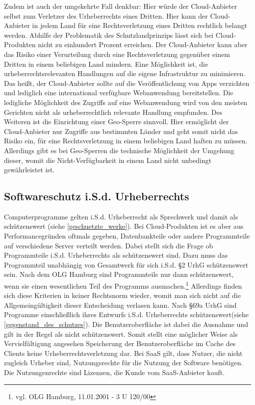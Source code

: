 Zudem ist auch der umgekehrte Fall denkbar: Hier w\"urde der Cloud-Anbieter selbst zum Verletzer des Urheberrechts eines Dritten. Hier kann der Cloud-Anbieter in jedem Land f\"ur eine Rechtsverletzung eines Dritten rechtlich belangt werden. Abhilfe der Problematik des Schutzlandprinzips l\"asst sich bei Cloud-Produkten nicht zu einhundert Prozent erreichen. Der Cloud-Anbieter kann aber das Risiko einer Verurteilung durch eine Rechtsverletzung gegen\"uber einem Dritten in einem beliebigen Land mindern. Eine M\"oglichkeit ist, die urheberrechtsrelevanten Handlungen auf die eigene Infrastruktur zu minimieren. Das hei{\ss}t, der Cloud-Anbieter sollte auf die Ver\"offentlichung von Apps verzichten und lediglich eine international verf\"ugbare Webanwendung bereitstellen. Die ledigliche M\"oglichkeit des Zugriffs auf eine Webanwendung wird von den meisten Gerichten nicht als urheberrechtlich relevante Handlung empfunden. \newline
Des Weiteren ist die Einrichtung einer Geo-Sperre sinnvoll. Hier erm\"oglicht der Cloud-Anbieter nur Zugriffe aus bestimmten L\"ander und geht somit nicht das Risiko ein, f\"ur eine Rechtsverletzung in einem beliebigen Land haften zu m\"ussen. Allerdings gibt es bei Geo-Sperren die technische M\"oglichkeit der Umgehung dieser, womit die Nicht-Verf\"ugbarkeit in einem Land nicht unbedingt gew\"ahrleistet ist.

 \subsection{Softwareschutz i.S.d. Urheberrechts}
Computerprogramme gelten i.S.d. Urheberrecht als Sprechwerk und damit als sch\"utzenswert (siehe \vref{geschuetzte_werke}). Bei Cloud-Produkten ist es aber aus Performancegr\"unden oftmals gegeben, Datenbankteile oder andere Programmteile auf verschiedene Server verteilt werden. Dabei stellt sich die Frage ob Programmteile i.S.d. Urheberrechts als sch\"utzenswert sind. Dazu muss das Programmteil unabh\"angig von Gesamtwerk f\"ur sich i.S.d. §2 UrhG sch\"utzenswert sein. Nach dem OLG Hamburg sind Programmteile nur dann sch\"utzenswert, wenn sie einen wesentlichen Teil des Programms ausmachen.\footnote{vgl. OLG Hamburg, 11.01.2001 - 3 U 120/00} Allerdings finden sich diese Kriterien in keiner Rechtsnorm wieder, womit man sich nicht auf die Allgemeing\"ultigkeit dieser Entscheidung verlasen kann.\newline
Nach §69a UrhG sind Programme einschlie{\ss}lich ihres Entwurfs i.S.d. Urheberrechts sch\"utzenswert(siehe \vref{gegenstand_des_schutzes}). Die Benutzeroberfl\"ache ist dabei die Ausnahme und gilt in der Regel als nicht sch\"utzenswert. Somit stellt eine m\"oglicher Weise als Vervielf\"altigung angesehen Speicherung der Benutzeroberfl\"ache im Cache des Clients keine Urheberrechtsverletzung dar.\newline
Bei SaaS gilt, dass Nutzer, die nicht zugleich Urheber sind, Nutzungsrechte f\"ur die Nutzung der Software ben\"otigen. Die Nutzungenrechte sind Lizenzen, die Kunde vom SaaS-Anbieter kauft.   

